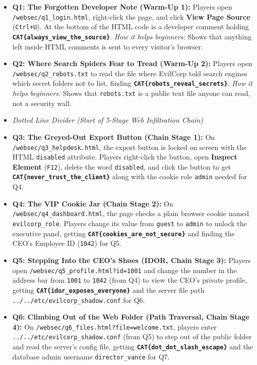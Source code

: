 \documentclass[11pt,a4paper]{article}
\begin{document}
\begin{itemize}
    \item \textbf{Q1: The Forgotten Developer Note (Warm-Up 1):} Players open \texttt{/websec/\allowbreak q1\_login.html}, right-click the page, and click \textbf{View Page Source} (\texttt{Ctrl+U}). At the bottom of the HTML code is a developer comment holding \textbf{\texttt{CAT\{always\_view\_the\_source\}}}. \textit{How it helps beginners:} Shows that anything left inside HTML comments is sent to every visitor's browser.
    \item \textbf{Q2: Where Search Spiders Fear to Tread (Warm-Up 2):} Players open \texttt{/websec/\allowbreak q2\_robots.txt} to read the file where EvilCorp told search engines which secret folders not to list, finding \textbf{\texttt{CAT\{robots\_reveal\_secrets\}}}. \textit{How it helps beginners:} Shows that \texttt{robots.txt} is a public text file anyone can read, not a security wall.
    \item \textit{Dotted Line Divider (Start of 5-Stage Web Infiltration Chain)}
    \item \textbf{Q3: The Greyed-Out Export Button (Chain Stage 1):} On \texttt{/websec/\allowbreak q3\_helpdesk.html}, the export button is locked on screen with the HTML \texttt{disabled} attribute. Players right-click the button, open \textbf{Inspect Element} (\texttt{F12}), delete the word \texttt{disabled}, and click the button to get \textbf{\texttt{CAT\{never\_trust\_the\_client\}}} along with the cookie role \texttt{admin} needed for Q4.
    \item \textbf{Q4: The VIP Cookie Jar (Chain Stage 2):} On \texttt{/websec/\allowbreak q4\_dashboard.html}, the page checks a plain browser cookie named \texttt{evilcorp\_role}. Players change its value from \texttt{guest} to \texttt{admin} to unlock the executive panel, getting \textbf{\texttt{CAT\{cookies\_are\_not\_secure\}}} and finding the CEO's Employee ID (\texttt{1042}) for Q5.
    \item \textbf{Q5: Stepping Into the CEO's Shoes (IDOR, Chain Stage 3):} Players open \texttt{/websec/\allowbreak q5\_profile.html?id=1001} and change the number in the address bar from \texttt{1001} to \texttt{1042} (from Q4) to view the CEO's private profile, getting \textbf{\texttt{CAT\{idor\_exposes\_everyone\}}} and the server file path \texttt{../../etc/\allowbreak evilcorp\_shadow.conf} for Q6.
    \item \textbf{Q6: Climbing Out of the Web Folder (Path Traversal, Chain Stage 4):} On \texttt{/websec/\allowbreak q6\_files.html?\allowbreak file=welcome.txt}, players enter \texttt{../../etc/\allowbreak evilcorp\_shadow.conf} (from Q5) to step out of the public folder and read the server's config file, getting \textbf{\texttt{CAT\{dot\_\allowbreak dot\_\allowbreak slash\_\allowbreak escape\}}} and the database admin username \texttt{director\_vance} for Q7.

\end{itemize}
\end{document}

